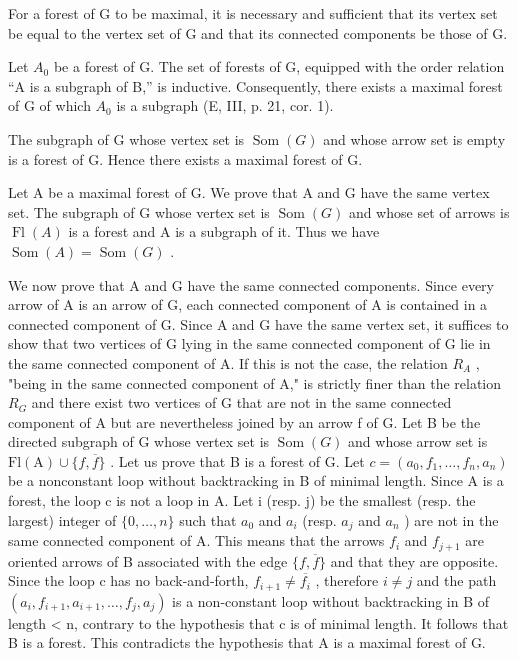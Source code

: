 For a forest of G to be maximal, it is necessary and sufficient that its vertex set be equal to the vertex set of G and that its connected components be those of G.

Let \(A_{0}\) be a forest of G. The set of forests of G, equipped with the order relation “A is a subgraph of B,” is inductive. Consequently, there exists a maximal forest of G of which \(A_{0}\) is a subgraph (E, III, p. 21, cor. 1).

The subgraph of G whose vertex set is \(\operatorname{Som}(G)\) and whose arrow set is empty is a forest of G. Hence there exists a maximal forest of G.

Let A be a maximal forest of G. We prove that A and G have the same vertex set. The subgraph of G whose vertex set is \(\operatorname{Som}(G)\) and whose set of arrows is \(\operatorname{Fl}(A)\) is a forest and A is a subgraph of it. Thus we have \(\operatorname{Som}(A) = \operatorname{Som}(G)\) .

We now prove that A and G have the same connected components. Since every arrow of A is an arrow of G, each connected component of A is contained in a connected component of G. Since A and G have the same vertex set, it suffices to show that two vertices of G lying in the same connected component of G lie in the same connected component of A. If this is not the case, the relation \(R_{A}\) , "being in the same connected component of A," is strictly finer than the relation \(R_{G}\) and there exist two vertices of G that are not in the same connected component of A but are nevertheless joined by an arrow f of G. Let B be the directed subgraph of G whose vertex set is \(\operatorname{Som}(G)\) and whose arrow set is \(\mathrm{Fl(A)} \cup \{f, \overline{f}\}\) . Let us prove that B is a forest of G. Let \(c = (a_{0}, f_{1}, \ldots, f_{n}, a_{n})\) be a nonconstant loop without backtracking in B of minimal length. Since A is a forest, the loop c is not a loop in A. Let i (resp. j) be the smallest (resp. the largest) integer of \(\{0, \ldots, n\}\) such that \(a_{0}\) and \(a_{i}\) (resp. \(a_{j}\) and \(a_{n}\) ) are not in the same connected component of A. This means that the arrows \(f_{i}\) and \(f_{j+1}\) are oriented arrows of B associated with the edge \(\{f, \overline{f}\}\) and that they are opposite. Since the loop c has no back-and-forth, \(f_{i+1} \neq \overline{f_{i}}\) , therefore \(i \neq j\) and the path \((a_{i}, f_{i+1}, a_{i+1}, \ldots, f_{j}, a_{j})\) is a non-constant loop without backtracking in B of length < n, contrary to the hypothesis that c is of minimal length. It follows that B is a forest. This contradicts the hypothesis that A is a maximal forest of G.

